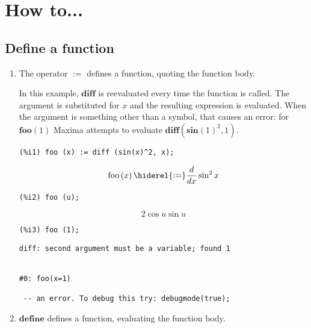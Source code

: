 \documentclass[12pt,leqno]{article}
\begin{document}
\section{How to...}

\subsection{Define a function}

\begin{enumerate}

\item The operator $\mathbf{:=}$ defines a function, quoting the function body.

In this example, $\mathbf{diff}$ is reevaluated every time the function is called.
The argument is substituted for $x$ and the resulting expression is evaluated.
When the argument is something other than a symbol, that causes an error:
for $\mathbf{foo} (1)$ Maxima attempts to evaluate $\mathbf{diff} (\mathbf{sin}(1)^2, 1)$.
\begin{verbatim}
(%i1) foo (x) := diff (sin(x)^2, x);
\end{verbatim}
\begin{dmath}[number={\(\mathop{\mathrm{\%o}_{1}}\)}]
\mathop{\mathrm{foo}}\left(x\right) \hiderel{:=} \frac{d}{d x}\sin^{2} x
\end{dmath}
\begin{verbatim}
(%i2) foo (u);
\end{verbatim}
\begin{dmath}[number={\(\mathop{\mathrm{\%o}_{2}}\)}]
2 \cos u \sin u
\end{dmath}
\begin{verbatim}
(%i3) foo (1);
\end{verbatim}
\begin{Verbatim}
diff: second argument must be a variable; found 1


#0: foo(x=1)

 -- an error. To debug this try: debugmode(true);
\end{Verbatim}


\item $\mathbf{define}$ defines a function, evaluating the function body.


\end{enumerate}
\end{document}
